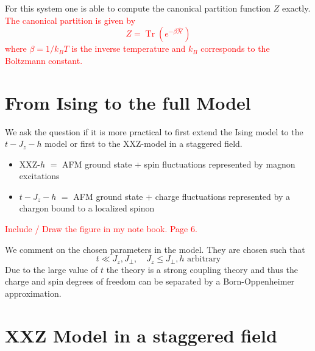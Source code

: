 \documentclass[11pt]{book}
\DeclareMathOperator{\Tr}{Tr}   %
\begin{document}
For this system one is able to compute the canonical partition function $Z$ exactly. 
\textcolor{red}{The canonical partition is given by 
\begin{equation}
  Z = \Tr\left(e^{-\beta \hat{\mathcal{H}} }\right)
\end{equation}
where $\beta= 1/k_B T$ is the inverse temperature and $k_B$ corresponds to the Boltzmann constant.
}

\section{From Ising to the full Model}\label{section2.3}
We ask the question if it is more practical to first extend the Ising model to the $t-J_z-h$ model or first to the XXZ-model in a staggered field. 
\begin{itemize}
  \item XXZ-$h$ $=$ AFM ground state $+$ spin fluctuations represented by magnon excitations 
  \item $t-J_z-h$ $=$ AFM ground state $+$ charge fluctuations represented by a chargon bound to a localized spinon
\end{itemize}

\textcolor{red}{Include / Draw the figure in my note book. Page 6.}

We comment on the chosen parameters in the model. They are chosen such that 
\begin{equation}
  t \ll J_z, J_\perp, \quad J_z \le J_\perp, h \text{ arbitrary}
\end{equation}
Due to the large value of $t$ the theory is a strong coupling theory and thus the charge and spin degrees of freedom can be separated by a Born-Oppenheimer approximation.


\section{XXZ Model in a staggered field\label{section2.4}}
\end{document}
